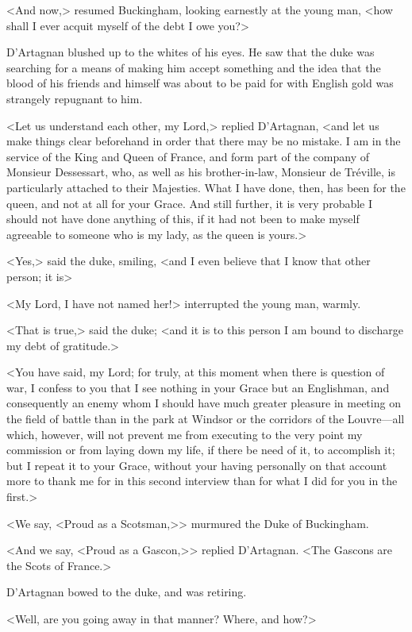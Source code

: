 <And now,> resumed Buckingham, looking earnestly at the young man, <how shall I ever acquit myself of the debt I owe you?> 

D'Artagnan blushed up to the whites of his eyes. He saw that the duke was searching for a means of making him accept something and the idea that the blood of his friends and himself was about to be paid for with English gold was strangely repugnant to him. 

<Let us understand each other, my Lord,> replied D'Artagnan, <and let us make things clear beforehand in order that there may be no mistake. I am in the service of the King and Queen of France, and form part of the company of Monsieur Dessessart, who, as well as his brother-in-law, Monsieur de Tréville, is particularly attached to their Majesties. What I have done, then, has been for the queen, and not at all for your Grace. And still further, it is very probable I should not have done anything of this, if it had not been to make myself agreeable to someone who is my lady, as the queen is yours.> 

<Yes,> said the duke, smiling, <and I even believe that I know that other person; it is\longdash> 

<My Lord, I have not named her!> interrupted the young man, warmly. 

<That is true,> said the duke; <and it is to this person I am bound to discharge my debt of gratitude.> 

<You have said, my Lord; for truly, at this moment when there is question of war, I confess to you that I see nothing in your Grace but an Englishman, and consequently an enemy whom I should have much greater pleasure in meeting on the field of battle than in the park at Windsor or the corridors of the Louvre—all which, however, will not prevent me from executing to the very point my commission or from laying down my life, if there be need of it, to accomplish it; but I repeat it to your Grace, without your having personally on that account more to thank me for in this second interview than for what I did for you in the first.> 

<We say, <Proud as a Scotsman,>> murmured the Duke of Buckingham. 

<And we say, <Proud as a Gascon,>> replied D'Artagnan. <The Gascons are the Scots of France.> 

D'Artagnan bowed to the duke, and was retiring. 

<Well, are you going away in that manner? Where, and how?> 

